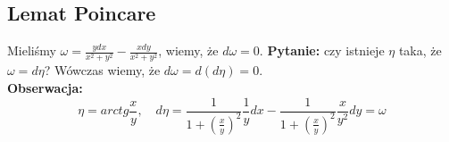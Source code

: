 \documentclass[../main.tex]{subfiles}
\begin{document}
\subsection{Lemat Poincare}
Mieliśmy $\omega = \frac{ydx}{x^2+y^2} - \frac{xdy}{x^2+y^2}$, wiemy, że $d\omega = 0$.
\textbf{Pytanie:} czy istnieje $\eta$ taka, że $\omega = d\eta$? Wówczas wiemy, że $d\omega = d(d\eta) = 0$.\\
 \textbf{Obserwacja:}
 \[
     \eta = arctg \frac{x}{y},\quad d\eta = \frac{1}{1+(\frac{x}{y})^2}\frac{1}{y}dx - \frac{1}{1+(\frac{x}{y})^2}\frac{x}{y^2}dy = \omega
 \]
\end{document}
